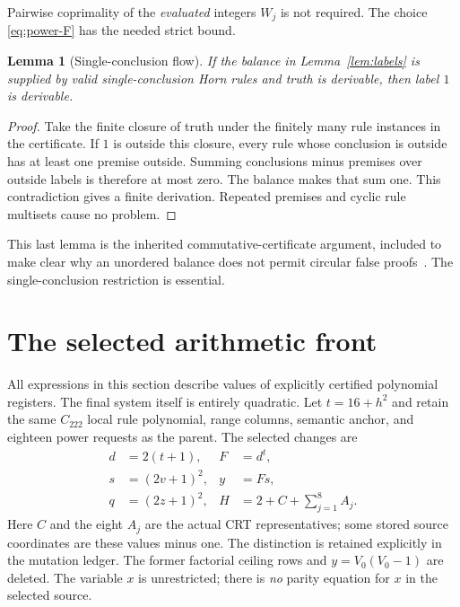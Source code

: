 \documentclass[11pt]{article}
\newtheorem{lemma}[theorem]{Lemma}
\theoremstyle{definition}
\begin{document}
Pairwise coprimality of the \emph{evaluated} integers $W_j$ is not
required. The choice \eqref{eq:power-F} has the needed strict bound.

\begin{lemma}[Single-conclusion flow]
If the balance in Lemma~\ref{lem:labels} is supplied by valid
single-conclusion Horn rules and truth is derivable, then label $1$ is
derivable.
\end{lemma}
\begin{proof}
Take the finite closure of truth under the finitely many rule instances
in the certificate. If $1$ is outside this closure, every rule whose
conclusion is outside has at least one premise outside. Summing
conclusions minus premises over outside labels is therefore at most
zero. The balance makes that sum one. This contradiction gives a finite
derivation. Repeated premises and cyclic rule multisets cause no problem.
\end{proof}

This last lemma is the inherited commutative-certificate argument, included
to make clear why an unordered balance does not permit circular false
proofs~\cite{flow}. The single-conclusion restriction is essential.

\section{The selected arithmetic front}

All expressions in this section describe values of explicitly certified
polynomial registers. The final system itself is entirely quadratic.
Let $t=16+h^2$ and retain the same $C_{222}$ local rule polynomial, range
columns, semantic anchor, and eighteen power requests as the parent.
The selected changes are
\begin{align}
 d&=2(t+1),&F&=d^t,\label{eq:new-F}\\
 s&=(2v+1)^2,&y&=Fs,\label{eq:new-y}\\
 q&=(2z+1)^2,&H&=2+C+\sum_{j=1}^{8}A_j.\label{eq:new-q}
\end{align}
Here $C$ and the eight $A_j$ are the actual CRT representatives; some
stored source coordinates are these values minus one. The distinction
is retained explicitly in the mutation ledger. The former factorial
ceiling rows and $y=V_0(V_0-1)$ are deleted. The variable $x$ is unrestricted;
there is \emph{no} parity equation for $x$ in the selected source.
\end{document}
